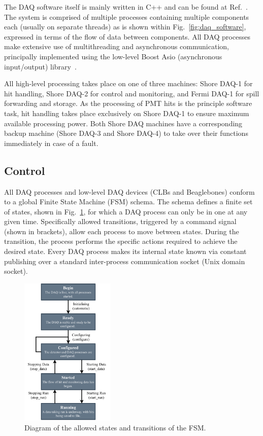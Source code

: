 The DAQ software itself is mainly written in C++ and can be found at Ref.~\cite{chipsdaq2020}. The
system is comprised of multiple processes containing multiple components each (usually on separate
threads) as is shown within Fig.~\ref{fig:daq_software}, expressed in terms of the flow of data
between components. All DAQ processes make extensive use of multithreading and asynchronous
communication, principally implemented using the low-level Boost Asio (asynchronous input/output)
library~\cite{boost2020}. 

All high-level processing takes place on one of three machines: Shore DAQ-1 for hit handling,
Shore DAQ-2 for control and monitoring, and Fermi DAQ-1 for \numi spill forwarding and storage. As
the processing of PMT hits is the principle software task, hit handling takes place exclusively on
Shore DAQ-1 to ensure maximum available processing power. Both Shore DAQ machines have a
corresponding backup machine (Shore DAQ-3 and Shore DAQ-4) to take over their functions
immediately in case of a fault.

\subsection{Control} %
\label{sec:daq_soft_control} %

All DAQ processes and low-level DAQ devices (CLBs and Beaglebones) conform to a global Finite
State Machine (FSM) schema. The schema defines a finite set of states, shown in
Fig.~\ref{fig:fsm}, for which a DAQ process can only be in one at any given time. Specifically
allowed transitions, triggered by a command signal (shown in brackets), allow each process to move
between states. During the transition, the process performs the specific actions required to
achieve the desired state. Every DAQ process makes its internal state known via constant
publishing over a standard inter-process communication socket (Unix domain socket).

\begin{figure} %
    \includegraphics[width=0.4\textwidth]{diagrams/5-daq/fsm.pdf}
    \caption[Diagram of the allowed states and transitions of the \chipsfive Finite State Machine]
    {Diagram of the allowed states and transitions of the \chipsfive FSM.}
    \label{fig:fsm}
\end{figure}


